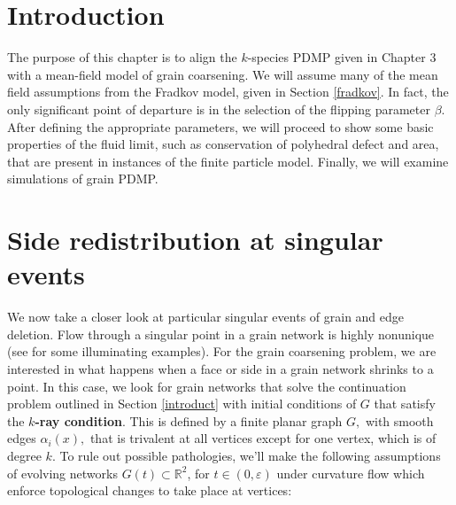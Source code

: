 \section{Introduction}
 
 The purpose of this chapter is to align the $k$-species PDMP given in Chapter 3 with a mean-field model of grain coarsening.  We will assume many of the mean field assumptions from the Fradkov model, given in Section \ref{fradkov}.  In fact, the only significant point of departure is in the selection of the flipping parameter $\beta$.  After defining the appropriate parameters, we will proceed to show some basic properties of the fluid limit, such as conservation of polyhedral defect and area, that are present in instances of  the finite particle model.   Finally, we will examine simulations of grain PDMP. 

\section{Side redistribution at singular events }


We now take a closer look at particular singular events of grain and edge deletion. Flow through a singular point in a grain network is highly nonunique (see \cite{evans1991motion} for some illuminating examples).  For the grain coarsening problem, we are interested in what happens when a face or side in a grain network shrinks to a point. In this case, we look for grain networks that solve the continuation problem outlined in Section \ref{introduct}  with initial conditions of $G$ that satisfy the    \textbf{$k$-ray  condition}.  This is defined by a  finite planar graph $G,$ with smooth edges $\alpha_i(x),$ that is trivalent at all vertices except for one vertex, which is of degree $k$. 
 To rule out possible pathologies, we'll make the following
assumptions of evolving networks $G(t)\subset \mathbb R^2$, for $t\in(0,\varepsilon)$ under curvature flow which  enforce topological changes to take place at vertices:


